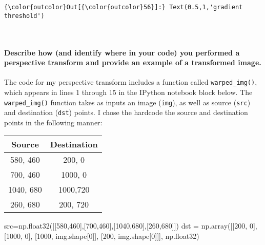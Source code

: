 \documentclass[11pt]{article}
\newenvironment{Shaded}{}{}
\newcommand{\DecValTok}[1]{\textcolor[rgb]{0.25,0.63,0.44}{{#1}}}
\newcommand{\NormalTok}[1]{{#1}}
\newcommand{\OperatorTok}[1]{\textcolor[rgb]{0.40,0.40,0.40}{{#1}}}
\begin{document}
\begin{Verbatim}[commandchars=\\\{\}]
{\color{outcolor}Out[{\color{outcolor}56}]:} Text(0.5,1,'gradient threshold')
\end{Verbatim}
            
    \begin{center}
    \end{center}
    { \hspace*{\fill} \\}
    
    \paragraph{Describe how (and identify where in your code) you performed
a perspective transform and provide an example of a transformed
image.}\label{describe-how-and-identify-where-in-your-code-you-performed-a-perspective-transform-and-provide-an-example-of-a-transformed-image.}

The code for my perspective transform includes a function called
\texttt{warped\_img()}, which appears in lines 1 through 15 in the
IPython notebook block below. The \texttt{warped\_img()} function takes
as inputs an image (\texttt{img}), as well as source (\texttt{src}) and
destination (\texttt{dst}) points. I chose the hardcode the source and
destination points in the following manner:

\begin{longtable}[]{@{}cc@{}}
\toprule
Source & Destination\tabularnewline
\midrule
\endhead
580, 460 & 200, 0\tabularnewline
700, 460 & 1000, 0\tabularnewline
1040, 680 & 1000,720\tabularnewline
260, 680 & 200, 720\tabularnewline
\bottomrule
\end{longtable}

\begin{Shaded}
\begin{Highlighting}[]
\NormalTok{src}\OperatorTok{=}\NormalTok{np.float32([[}\DecValTok{580}\NormalTok{,}\DecValTok{460}\NormalTok{],[}\DecValTok{700}\NormalTok{,}\DecValTok{460}\NormalTok{],[}\DecValTok{1040}\NormalTok{,}\DecValTok{680}\NormalTok{],[}\DecValTok{260}\NormalTok{,}\DecValTok{680}\NormalTok{]])}
\NormalTok{dst }\OperatorTok{=}\NormalTok{ np.array([[}\DecValTok{200}\NormalTok{, }\DecValTok{0}\NormalTok{], [}\DecValTok{1000}\NormalTok{, }\DecValTok{0}\NormalTok{], [}\DecValTok{1000}\NormalTok{, img.shape[}\DecValTok{0}\NormalTok{]], [}\DecValTok{200}\NormalTok{, img.shape[}\DecValTok{0}\NormalTok{]]], np.float32)}
\end{Highlighting}
\end{Shaded}
\end{document}
